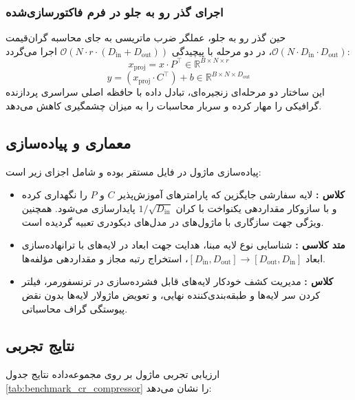 \subsubsection*{اجرای گذر رو به جلو در فرم فاکتورسازی‌شده}
حین گذر رو به جلو، عملگر ضرب ماتریسی به جای محاسبه گران‌قیمت $\mathcal{O}(N \cdot D_{\text{in}} \cdot D_{\text{out}})$، در دو مرحله با پیچیدگی $\mathcal{O}(N \cdot r \cdot (D_{\text{in}} + D_{\text{out}}))$ اجرا می‌گردد:
\begin{equation}
x_{\text{proj}} = x \cdot P^\top \in \mathbb{R}^{B \times N \times r}
\end{equation}
\begin{equation}
y = (x_{\text{proj}} \cdot C^\top) + b \in \mathbb{R}^{B \times N \times D_{\text{out}}}
\end{equation}
این ساختار دو مرحله‌ای زنجیره‌ای، تبادل داده با حافظه اصلی سراسری پردازنده گرافیکی را مهار کرده و سربار محاسبات را به میزان چشمگیری کاهش می‌دهد.

\subsection{معماری و پیاده‌سازی}
پیاده‌سازی ماژول در فایل  مستقر بوده و شامل اجزای زیر است:
\begin{itemize}
    \item \textbf{کلاس :} لایه سفارشی جایگزین  که پارامترهای آموزش‌پذیر $C$ و $P$ را نگهداری کرده و با سازوکار مقداردهی یکنواخت با کران $1/\sqrt{D_{\text{in}}}$ پایدارسازی می‌شود. همچنین ویژگی  جهت سازگاری با ماژول‌های  در مدل‌های دیکودری تعبیه گردیده است.
    \item \textbf{متد کلاسی :} شناسایی نوع لایه مبنا، هدایت جهت ابعاد در لایه‌های  با ترانهاده‌سازی ابعاد $[D_{\text{in}}, D_{\text{out}}] \to [D_{\text{out}}, D_{\text{in}}]$، استخراج رتبه مجاز و مقداردهی مؤلفه‌ها.
    \item \textbf{کلاس :} مدیریت کشف خودکار لایه‌های قابل فشرده‌سازی در ترنسفورمر، فیلتر کردن سر لایه‌ها و طبقه‌بندی‌کننده نهایی، و تعویض ماژولار لایه‌ها بدون نقض پیوستگی گراف محاسباتی.
\end{itemize}

\subsection{نتایج تجربی}
ارزیابی تجربی ماژول  بر روی مجموعه‌داده  نتایج جدول \ref{tab:benchmark_cr_compressor} را نشان می‌دهد:

